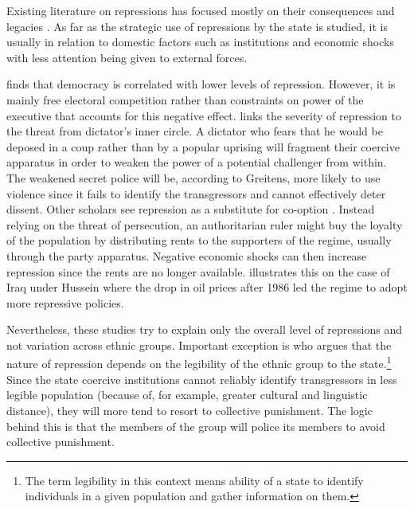 Existing literature on repressions has focused mostly on their consequences and legacies \citep{rozenas_political_2017, lupu_legacy_2017, zhukov_stalins_2018}. As far as the strategic use of repressions by the state is studied, it is usually in relation to domestic factors such as institutions and economic shocks \citep{davenport_state_2007, greitens_dictators_2016, blaydes_state_2018} with less attention being given to external forces. 

\citet{davenport_state_2007} finds that democracy is correlated with lower levels of repression. However, it is mainly free electoral competition rather than constraints on power of the executive that accounts for this negative effect.  
\citet{greitens_dictators_2016} links the severity of repression to the threat from dictator's inner circle. A dictator who fears that he would be deposed in a coup rather than by a popular uprising will fragment their coercive apparatus in order to weaken the power of a potential challenger from within. The weakened secret police will be, according to Greitens, more likely to use violence since it fails to identify the transgressors and cannot effectively deter dissent. 
Other scholars see repression as a substitute for co-option \citep{wintrobe_political_1998, svolik_politics_2012}. Instead relying on the threat of persecution, an authoritarian ruler might buy the loyalty of the population by distributing rents to the supporters of the regime, usually through the party apparatus. Negative economic shocks can then increase repression since the rents are no longer available.  \citet{blaydes_state_2018} 
illustrates this on the case of Iraq under Hussein where the drop in  oil prices after 1986 led the regime to adopt more repressive policies.  

Nevertheless, these studies try to explain only the overall level of repressions and not variation across ethnic groups.
Important exception is \citet{blaydes_state_2018} who 
argues that the nature of repression  depends on the legibility of the ethnic group to the state.\footnote{The term legibility in this context means ability of a state to identify individuals in a given population and gather information on them.}
 Since the state coercive institutions cannot reliably identify transgressors in  less legible population (because of, for example, greater cultural and linguistic distance), they will more tend to resort to collective punishment. The logic behind this is that the members of the group will police its members to avoid collective punishment. 

